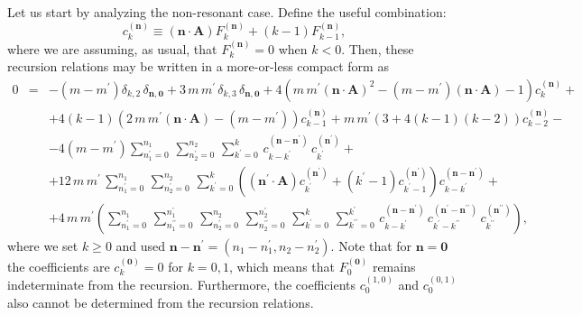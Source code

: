\documentclass[11pt,a4paper]{article}
\begin{document}
Let us start by analyzing the non-resonant case. Define the useful combination:
%
\begin{equation}
c^{(\boldsymbol{n})}_{k} \equiv \left( \boldsymbol{n} \cdot \boldsymbol{A} \right) F^{(\boldsymbol{n})}_k + \left(k-1\right) F^{(\boldsymbol{n})}_{k-1},
\end{equation}
%
\noindent
where we are assuming, as usual, that $F^{(\boldsymbol{n})}_k=0$ when $k<0$. Then, these recursion relations may be written in a more-or-less compact form as
%
\begin{eqnarray}
0 &=& -\left( m-m^\prime \right) \delta_{k,2}\, \delta_{\boldsymbol{n},\boldsymbol{0}} + 3\, m\, m^\prime\, \delta_{k,3}\, \delta_{\boldsymbol{n},\boldsymbol{0}} + 4 \left( m\, m^\prime \left( \boldsymbol{n} \cdot \boldsymbol{A} \right)^2 - \left( m-m^\prime \right) \left( \boldsymbol{n} \cdot \boldsymbol{A} \right) -1 \right) c^{(\boldsymbol{n})}_k + \nonumber \\
&&
+ 4 \left( k-1 \right) \left( 2\, m\, m^\prime \left( \boldsymbol{n} \cdot \boldsymbol{A} \right) - \left( m-m^\prime \right) \right) c^{(\boldsymbol{n})}_{k-1} + m\, m^\prime \left( 3 + 4 \left(k-1\right) \left(k-2\right) \right) c^{(\boldsymbol{n})}_{k-2} - \nonumber \\
&&
- 4 \left( m-m^\prime \right) \sum_{n_1^\prime=0}^{n_1}\, \sum_{n_2^\prime=0}^{n_2}\, \sum_{k^\prime=0}^{k}\, c^{(\boldsymbol{n} - \boldsymbol{n}^\prime)}_{k-k^\prime}\, c^{(\boldsymbol{n}^\prime)}_{k^\prime} + \nonumber \\
&&
+ 12\, m\, m^\prime\, \sum_{n_1^\prime=0}^{n_1}\, \sum_{n_2^\prime=0}^{n_2}\, \sum_{k^\prime=0}^{k} \left( \left( \boldsymbol{n}^\prime \cdot \boldsymbol{A} \right) c^{(\boldsymbol{n}^\prime)}_{k^\prime} + \left( k^\prime-1 \right) c^{(\boldsymbol{n}^\prime)}_{k^\prime-1} \right) c^{(\boldsymbol{n}-\boldsymbol{n}^\prime)}_{k-k^\prime} + \nonumber \\
&&
+ 4\, m\, m^\prime \left( \sum_{n_1^\prime=0}^{n_1}\, \sum_{n_1^{\prime\prime}=0}^{n_1^\prime}\, \sum_{n_2^\prime=0}^{n_2}\, \sum_{n_2^{\prime\prime}=0}^{n_2^\prime}\, \sum_{k^\prime=0}^k\, \sum_{k^{\prime\prime}=0}^{k^\prime}\, c^{(\boldsymbol{n}-\boldsymbol{n}^\prime)}_{k-k^\prime}\, c^{(\boldsymbol{n}^\prime-\boldsymbol{n}^{\prime\prime})}_{k^\prime-k^{\prime\prime}}\, c^{(\boldsymbol{n}^{\prime\prime})}_{k^{\prime\prime}} \right),
\label{eq:ell_nl_recursion}
\end{eqnarray}
%
\noindent
where we set $k\ge 0$ and used $\boldsymbol{n}-\boldsymbol{n}^{\prime} = \left( n_1-n_1^{\prime}, n_2-n_2^{\prime} \right)$. Note that for $\boldsymbol{n} = \boldsymbol{0}$ the coefficients are $c^{(\boldsymbol{0})}_k=0$ for $k=0,1$, which means that $F^{(\boldsymbol{0})}_0$ remains indeterminate from the recursion. Furthermore, the coefficients $c^{(1,0)}_0$ and $c^{(0,1)}_0$ also cannot be determined from the recursion relations.
\end{document}
